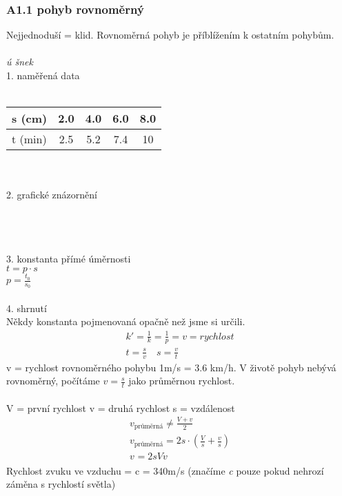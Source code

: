 \documentclass{article}
\begin{document}
\subsubsection*{A1.1 pohyb rovnoměrný}
Nejjednoduší = klid. Rovnoměrná pohyb je příblížením k ostatním pohybům. \\\\
\emph{ú šnek}\\
1. naměřená data\\\\
\begin{tabular}{l|c|c|c|c}
    s (cm) & 2.0 & 4.0 & 6.0 & 8.0 \\
\hline
    t (min) & 2.5 & 5.2 & 7.4 & 10 
\end{tabular}\\\\
2. grafické znázornění \\\\
\\\\
3. konstanta přímé úměrnosti\\
$t = p \cdot s$\\
$p = \frac{t_0}{s_0}$\\\\
4. shrnutí\\
Někdy konstanta pojmenovaná opačně než jsme si určili.
\begin{align*}
    k' = \frac{1}{k} = \frac{1}{p} = v = rychlost\\
    t = \frac{s}{v} \quad s = \frac{v}{t}
\end{align*}
v = rychlost rovnoměrného pohybu 1m/s = 3.6 km/h. V životě pohyb nebývá rovnoměrný, počítáme $v = \frac{s}{t}$ jako průměrnou rychlost.\\\\
V = první rychlost v = druhá rychlost s = vzdálenost
\begin{align*}
    v_{\text{průměrná}} \neq \frac{V+v}{2}\\
    v_{\text{průměrná}} = 2s \cdot (\frac{V}{s}+\frac{v}{s})\\
    v_{} = 2sVv
\end{align*}
Rychlost zvuku ve vzduchu = c = 340m/s (značíme \emph{c} pouze pokud nehrozí záměna s rychlostí světla)
\end{document}
